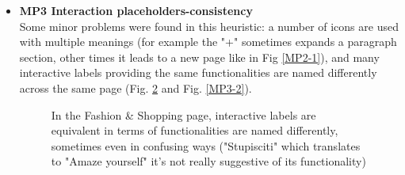 \begin{itemize}
\begin{figure}[!ht]
\begin{minipage}{\linewidth}
                \label{MP2-2}
            \end{minipage}
        \end{figure}
    \item \textbf{MP3 Interaction placeholders-consistency}\\
        Some minor problems were found in this heuristic:
        a number of icons are used with multiple meanings (for example the "+" sometimes expands a paragraph section, other times it leads to a new page like in Fig \ref{MP2-1}), and many interactive labels providing the same functionalities are named differently across the same page (Fig. \ref{MP3-1} and Fig. \ref{MP3-2}).
        \begin{figure}[!ht]
            \begin{minipage}{\linewidth}
                \centering
                \captionsetup{justification=centering}
                \caption{In the Fashion \& Shopping page, interactive labels are equivalent in terms of functionalities are named differently, sometimes even in confusing ways ("Stupisciti" which translates to "Amaze yourself" it's not really suggestive of its functionality)}
                \label{MP3-1}
            \end{minipage}
        \end{figure}
        \begin{figure}[!ht]
            \begin{minipage}{\linewidth}
                \centering

\end{minipage}
\end{figure}
\end{itemize}
